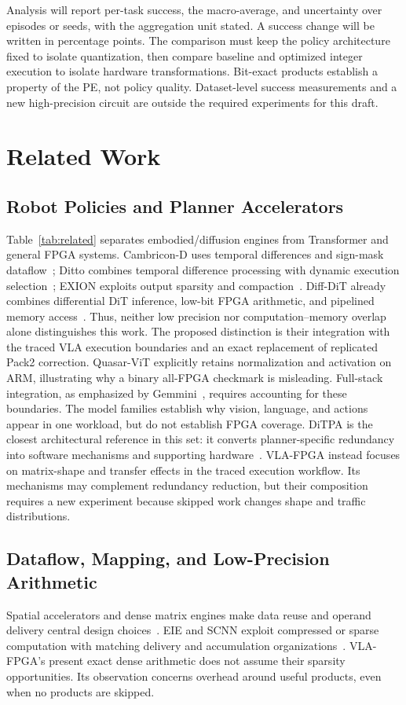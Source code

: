\documentclass[10pt,conference,letterpaper]{IEEEtran}
\begin{document}
Analysis will report per-task success, the macro-average, and uncertainty over episodes or seeds, with the aggregation unit stated. A success change will be written in percentage points. The comparison must keep the policy architecture fixed to isolate quantization, then compare baseline and optimized integer execution to isolate hardware transformations. Bit-exact products establish a property of the PE, not policy quality. Dataset-level success measurements and a new high-precision circuit are outside the required experiments for this draft.

\section{Related Work}


\subsection{Robot Policies and Planner Accelerators}
Table~\ref{tab:related} separates embodied/diffusion engines from Transformer and general FPGA systems. Cambricon-D uses temporal differences and sign-mask dataflow~\cite{camd}; Ditto combines temporal difference processing with dynamic execution selection~\cite{ditto}; EXION exploits output sparsity and compaction~\cite{exion}. Diff-DiT already combines differential DiT inference, low-bit FPGA arithmetic, and pipelined memory access~\cite{diffdit}. Thus, neither low precision nor computation--memory overlap alone distinguishes this work. The proposed distinction is their integration with the traced VLA execution boundaries and an exact replacement of replicated Pack2 correction. Quasar-ViT explicitly retains normalization and activation on ARM, illustrating why a binary all-FPGA checkmark is misleading. Full-stack integration, as emphasized by Gemmini~\cite{gemmini}, requires accounting for these boundaries. The model families establish why vision, language, and actions appear in one workload, but do not establish FPGA coverage. DiTPA is the closest architectural reference in this set: it converts planner-specific redundancy into software mechanisms and supporting hardware~\cite{ditpa}. VLA-FPGA instead focuses on matrix-shape and transfer effects in the traced execution workflow. Its mechanisms may complement redundancy reduction, but their composition requires a new experiment because skipped work changes shape and traffic distributions.

\subsection{Dataflow, Mapping, and Low-Precision Arithmetic}
Spatial accelerators and dense matrix engines make data reuse and operand delivery central design choices~\cite{eyeriss,tpu}. EIE and SCNN exploit compressed or sparse computation with matching delivery and accumulation organizations~\cite{eie,scnn}. VLA-FPGA's present exact dense arithmetic does not assume their sparsity opportunities. Its observation concerns overhead around useful products, even when no products are skipped.
\end{document}
